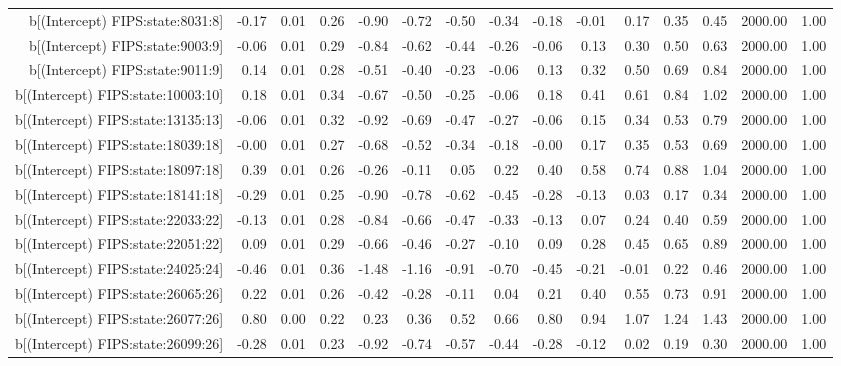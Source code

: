 \begin{table}[ht]
\begin{tabular}{rrrrrrrrrrrrrrr}
  b[(Intercept) FIPS:state:8031:8] & -0.17 & 0.01 & 0.26 & -0.90 & -0.72 & -0.50 & -0.34 & -0.18 & -0.01 & 0.17 & 0.35 & 0.45 & 2000.00 & 1.00 \\ 
  b[(Intercept) FIPS:state:9003:9] & -0.06 & 0.01 & 0.29 & -0.84 & -0.62 & -0.44 & -0.26 & -0.06 & 0.13 & 0.30 & 0.50 & 0.63 & 2000.00 & 1.00 \\ 
  b[(Intercept) FIPS:state:9011:9] & 0.14 & 0.01 & 0.28 & -0.51 & -0.40 & -0.23 & -0.06 & 0.13 & 0.32 & 0.50 & 0.69 & 0.84 & 2000.00 & 1.00 \\ 
  b[(Intercept) FIPS:state:10003:10] & 0.18 & 0.01 & 0.34 & -0.67 & -0.50 & -0.25 & -0.06 & 0.18 & 0.41 & 0.61 & 0.84 & 1.02 & 2000.00 & 1.00 \\ 
  b[(Intercept) FIPS:state:13135:13] & -0.06 & 0.01 & 0.32 & -0.92 & -0.69 & -0.47 & -0.27 & -0.06 & 0.15 & 0.34 & 0.53 & 0.79 & 2000.00 & 1.00 \\ 
  b[(Intercept) FIPS:state:18039:18] & -0.00 & 0.01 & 0.27 & -0.68 & -0.52 & -0.34 & -0.18 & -0.00 & 0.17 & 0.35 & 0.53 & 0.69 & 2000.00 & 1.00 \\ 
  b[(Intercept) FIPS:state:18097:18] & 0.39 & 0.01 & 0.26 & -0.26 & -0.11 & 0.05 & 0.22 & 0.40 & 0.58 & 0.74 & 0.88 & 1.04 & 2000.00 & 1.00 \\ 
  b[(Intercept) FIPS:state:18141:18] & -0.29 & 0.01 & 0.25 & -0.90 & -0.78 & -0.62 & -0.45 & -0.28 & -0.13 & 0.03 & 0.17 & 0.34 & 2000.00 & 1.00 \\ 
  b[(Intercept) FIPS:state:22033:22] & -0.13 & 0.01 & 0.28 & -0.84 & -0.66 & -0.47 & -0.33 & -0.13 & 0.07 & 0.24 & 0.40 & 0.59 & 2000.00 & 1.00 \\ 
  b[(Intercept) FIPS:state:22051:22] & 0.09 & 0.01 & 0.29 & -0.66 & -0.46 & -0.27 & -0.10 & 0.09 & 0.28 & 0.45 & 0.65 & 0.89 & 2000.00 & 1.00 \\ 
  b[(Intercept) FIPS:state:24025:24] & -0.46 & 0.01 & 0.36 & -1.48 & -1.16 & -0.91 & -0.70 & -0.45 & -0.21 & -0.01 & 0.22 & 0.46 & 2000.00 & 1.00 \\ 
  b[(Intercept) FIPS:state:26065:26] & 0.22 & 0.01 & 0.26 & -0.42 & -0.28 & -0.11 & 0.04 & 0.21 & 0.40 & 0.55 & 0.73 & 0.91 & 2000.00 & 1.00 \\ 
  b[(Intercept) FIPS:state:26077:26] & 0.80 & 0.00 & 0.22 & 0.23 & 0.36 & 0.52 & 0.66 & 0.80 & 0.94 & 1.07 & 1.24 & 1.43 & 2000.00 & 1.00 \\ 
  b[(Intercept) FIPS:state:26099:26] & -0.28 & 0.01 & 0.23 & -0.92 & -0.74 & -0.57 & -0.44 & -0.28 & -0.12 & 0.02 & 0.19 & 0.30 & 2000.00 & 1.00 \\ 

\end{tabular}
\end{table}
